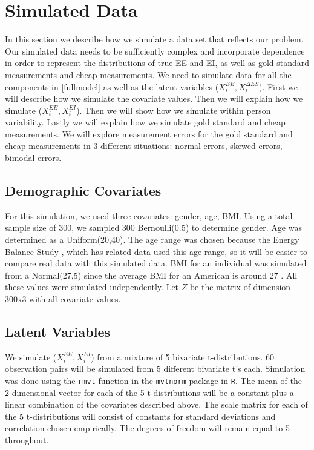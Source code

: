\documentclass[11pt]{article}\usepackage[]{graphicx}\usepackage[]{color}
\begin{document}
\section{Simulated Data}

In this section we describe how we simulate a data set that reflects our problem. Our simulated data needs to be sufficiently complex and incorporate dependence in order to represent the distributions of true EE and EI, as well as gold standard measurements and cheap measurements. We need to simulate data for all the components in \eqref{fullmodel} as well as the latent variables ($X_i^{EE}, X_i^{\Delta ES}$). First we will describe how we simulate the covariate values. Then we will explain how we simulate ($X_i^{EE}, X_i^{EI}$). Then we will show how we simulate within person variability. Lastly we will explain how we simulate gold standard and cheap measurements. We will explore measurement errors for the gold standard and cheap measurements in 3 different situations: normal errors, skewed errors, bimodal errors. 

\subsection{Demographic Covariates}

For this simulation, we used three covariates: gender, age, BMI. Using a total sample size of 300, we sampled 300 Bernoulli(0.5) to determine gender. Age was determined as a Uniform(20,40). The age range was chosen because the Energy Balance Study \cite{hand}, which has related data used this age range, so it will be easier to compare real data with this simulated data. BMI for an individual was simulated from a Normal(27,5) since the average BMI for an American is around 27 \cite{cdc}. All these values were simulated independently. Let $Z$ be the matrix of dimension 300x3 with all covariate values.


\subsection{Latent Variables}

We simulate ($X_i^{EE}, X_i^{EI}$) from a mixture of 5 bivariate t-distributions. 60 observation pairs will be simulated from 5 different bivariate t's each. Simulation was done using the \texttt{rmvt} function in the \texttt{mvtnorm} package in \texttt{R}. The mean of the 2-dimensional vector for each of the 5 t-distributions will be a constant plus a linear combination of the covariates described above. The scale matrix for each of the 5 t-distributions will consist of constants for standard deviations and correlation chosen empirically. The degrees of freedom will remain equal to 5 throughout. 
\end{document}
